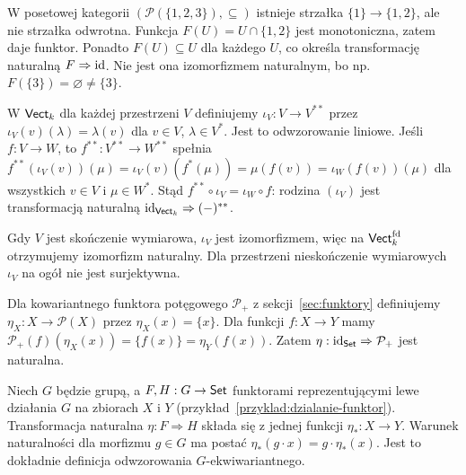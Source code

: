 \begin{przyklad}
W posetowej kategorii $(\mathcal P(\{1,2,3\}),\subseteq)$ istnieje strzałka $\{1\}\to\{1,2\}$, ale nie strzałka odwrotna. Funkcja $F(U)=U\cap\{1,2\}$ jest monotoniczna, zatem daje funktor. Ponadto $F(U)\subseteq U$ dla każdego $U$, co określa transformację naturalną $F\Rightarrow\mathrm{id}$. Nie jest ona izomorfizmem naturalnym, bo np. $F(\{3\})=\varnothing\neq\{3\}$.
\end{przyklad}

\begin{przyklad}\label{przyklad:podwojny-dual}
W $\mathsf{Vect}_k$ dla każdej przestrzeni $V$ definiujemy $\iota_V:V\to V^{**}$ przez $\iota_V(v)(\lambda)=\lambda(v)$ dla $v\in V$, $\lambda\in V^*$. Jest to odwzorowanie liniowe. Jeśli $f:V\to W$, to $f^{**}:V^{**}\to W^{**}$ spełnia
$f^{**}(\iota_V(v))(\mu)=\iota_V(v)(f^*(\mu))=\mu(f(v))=\iota_W(f(v))(\mu)$
dla wszystkich $v\in V$ i $\mu\in W^*$. Stąd $f^{**}\circ\iota_V=\iota_W\circ f$: rodzina $(\iota_V)$ jest transformacją naturalną $\mathrm{id}_{\mathsf{Vect}_k}\Rightarrow(-)^{**}$.

Gdy $V$ jest skończenie wymiarowa, $\iota_V$ jest izomorfizmem, więc na $\mathsf{Vect}_k^{\mathrm{fd}}$ otrzymujemy izomorfizm naturalny. Dla przestrzeni nieskończenie wymiarowych $\iota_V$ na ogół nie jest surjektywna.
\end{przyklad}

\begin{przyklad}
Dla kowariantnego funktora potęgowego $\mathcal P_+$ z sekcji~\ref{sec:funktory} definiujemy $\eta_X:X\to\mathcal P(X)$ przez $\eta_X(x)=\{x\}$. Dla funkcji $f:X\to Y$ mamy $\mathcal P_+(f)(\eta_X(x))=\{f(x)\}=\eta_Y(f(x))$. Zatem $\eta:\mathrm{id}_{\mathsf{Set}}\Rightarrow\mathcal P_+$ jest naturalna.
\end{przyklad}

\begin{przyklad}
Niech $G$ będzie grupą, a $F,H:G\to\mathsf{Set}$ funktorami reprezentującymi lewe działania $G$ na zbiorach $X$ i $Y$ (przykład~\ref{przyklad:dzialanie-funktor}). Transformacja naturalna $\eta:F\Rightarrow H$ składa się z jednej funkcji $\eta_*:X\to Y$. Warunek naturalności dla morfizmu $g\in G$ ma postać $\eta_*(g\cdot x)=g\cdot\eta_*(x)$. Jest to dokładnie definicja odwzorowania $G$-ekwiwariantnego.
\end{przyklad}

